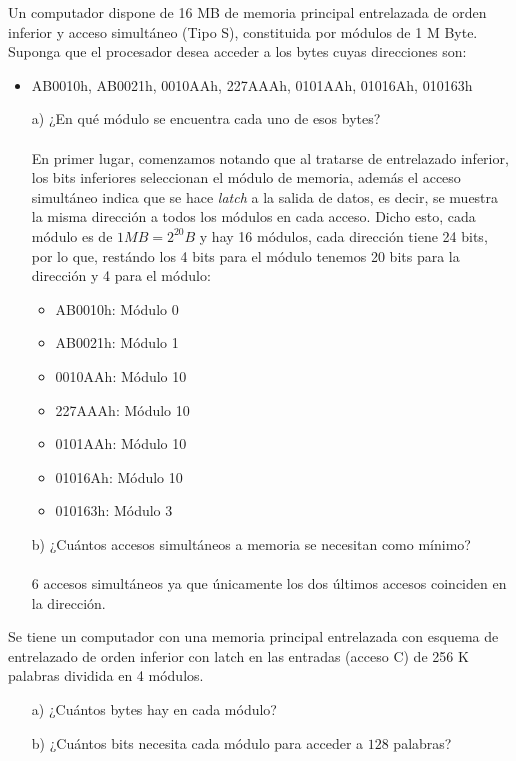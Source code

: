 \begin{ejercicio}
    Un computador dispone de 16 MB de memoria principal entrelazada de orden inferior y acceso simultáneo (Tipo S), constituida por módulos de 1 M Byte. Suponga que el procesador desea acceder a los bytes cuyas direcciones son:
    \begin{itemize}
        \item AB0010h, AB0021h, 0010AAh, 227AAAh, 0101AAh, 01016Ah, 010163h
    \end{itemize}
    \begin{itemize}
        \item[a)] ¿En qué módulo se encuentra cada uno de esos bytes?
            \\ \\ En primer lugar, comenzamos notando que al tratarse de entrelazado inferior, los bits inferiores seleccionan el módulo de
            memoria, además el acceso simultáneo indica que se hace \textit{latch} a la salida de datos, es decir, se muestra la misma
            dirección a todos los módulos en cada acceso. Dicho esto, cada módulo es de $1MB = 2^{20}B$ y hay 16 módulos, cada dirección tiene
            24 bits, por lo que, restándo los 4 bits para el módulo tenemos 20 bits para la dirección y 4 para el módulo:
            \begin{itemize}
                \item AB0010h: Módulo 0
                \item AB0021h: Módulo 1
                \item 0010AAh: Módulo 10
                \item 227AAAh: Módulo 10
                \item 0101AAh: Módulo 10
                \item 01016Ah: Módulo 10
                \item 010163h: Módulo 3
            \end{itemize}
        \item[b)] ¿Cuántos accesos simultáneos a memoria se necesitan como mínimo?
            \\ \\
            6 accesos simultáneos ya que únicamente los dos últimos accesos coinciden en la dirección.
    \end{itemize}
\end{ejercicio}

\begin{ejercicio}
    Se tiene un computador con una memoria principal entrelazada con esquema de entrelazado de orden inferior con latch en las entradas (acceso C) de 256 K palabras dividida en 4 módulos.
    \begin{itemize}
        \item[a)] ¿Cuántos bytes hay en cada módulo?
        \item[b)] ¿Cuántos bits necesita cada módulo para acceder a \( 128 \) palabras?
    \end{itemize}
\end{ejercicio}

